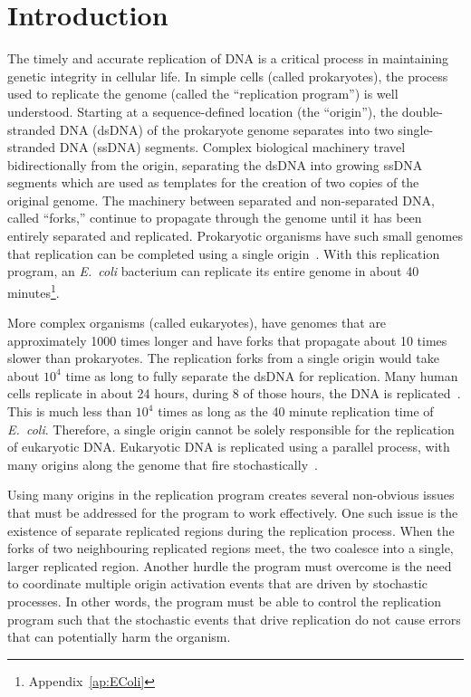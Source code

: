\chapter{Introduction}
\label{ch:Introduction}

The timely and accurate replication of DNA is a critical process in maintaining genetic integrity in cellular life.
In simple cells (called prokaryotes), the process used to replicate the genome (called the ``replication program'') is well understood.
Starting at a sequence-defined location (the ``origin''), the double-stranded DNA (dsDNA) of the prokaryote genome separates into two single-stranded DNA (ssDNA) segments.
Complex biological machinery travel bidirectionally from the origin, separating the dsDNA into growing ssDNA segments which are used as templates for the creation of two copies of the original genome.
The machinery between separated and non-separated DNA, called ``forks,'' continue to propagate through the genome until it has been entirely separated and replicated.
Prokaryotic organisms have such small genomes that replication can be completed using a single origin~\cite{MolecularCellBiology}.
With this replication program, an \emph{E.~coli} bacterium can replicate its entire genome in about 40 minutes\footnote{Appendix~\ref{ap:EColi}}.

More complex organisms (called eukaryotes), have genomes that are approximately 1000 times longer and have forks that propagate about 10 times slower than prokaryotes.
The replication forks from a single origin would take about $10^4$ time as long to fully separate the dsDNA for replication.
Many human cells replicate in about 24 hours, during 8 of those hours, the DNA is replicated~\cite{CellMolApproach}.
This is much less than $10^4$ times as long as the 40 minute replication time of \emph{E.~coli}.
Therefore, a single origin cannot be solely responsible for the replication of eukaryotic DNA.
Eukaryotic DNA is replicated using a parallel process, with many origins along the genome that fire stochastically~\cite{eukaryotereview}.

Using many origins in the replication program creates several non-obvious issues that must be addressed for the program to work effectively.
One such issue is the existence of separate replicated regions during the replication process.
When the forks of two neighbouring replicated regions meet, the two coalesce into a single, larger replicated region.
Another hurdle the program must overcome is the need to coordinate multiple origin activation events that are driven by stochastic processes.
In other words, the program must be able to control the replication program such that the stochastic events that drive replication do not cause errors that can potentially harm the organism.~\cite{eukaryotereview}


